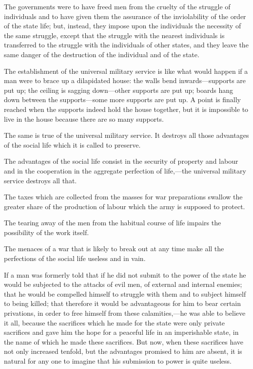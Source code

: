 \documentclass{book}
\begin{document}
The governments were to have freed men from the cruelty of the struggle of individuals and to have given them the assurance of the inviolability of the order of the state life; but, instead, they impose upon the individuals the necessity of the same struggle, except that the struggle with the nearest individuals is transferred to the struggle with the individuals of other states, and they leave the same danger of the destruction of the individual and of the state.

The establishment of the universal military service is like what would happen if a man were to brace up a dilapidated house: the walls bend inwards—supports are put up; the ceiling is sagging down—other supports are put up; boards hang down between the supports—some more supports are put up. A point is finally reached when the supports indeed hold the house together, but it is impossible to live in the house because there are so many supports.

The same is true of the universal military service. It destroys all those advantages of the social life which it is called to preserve.

The advantages of the social life consist in the security of property and labour and in the cooperation in the aggregate perfection of life,—the universal military service destroys all that.

The taxes which are collected from the masses for war preparations swallow the greater share of the production of labour which the army is supposed to protect.

The tearing away of the men from the habitual course of life impairs the possibility of the work itself.

The menaces of a war that is likely to break out at any time make all the perfections of the social life useless and in vain.

If a man was formerly told that if he did not submit to the power of the state he would be subjected to the attacks of evil men, of external and internal enemies; that he would be compelled himself to struggle with them and to subject himself to being killed; that therefore it would be advantageous for him to bear certain privations, in order to free himself from these calamities,—he was able to believe it all, because the sacrifices which he made for the state were only private sacrifices and gave him the hope for a peaceful life in an imperishable state, in the name of which he made these sacrifices. But now, when these sacrifices have not only increased tenfold, but the advantages promised to him are absent, it is natural for any one to imagine that his submission to power is quite useless.
\end{document}
